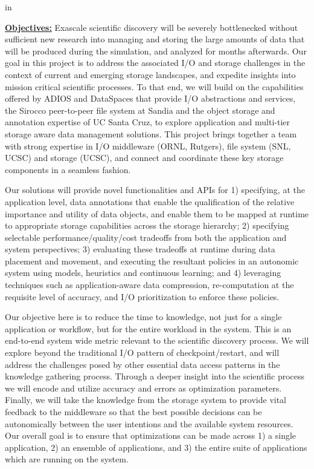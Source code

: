 \documentclass[11pt,letterpaper]{article}
\begin{document}
\setlength{\parindent}{0.5cm}

 in


\underline{\textbf{Objectives:}} Exascale scientific discovery will be
severely bottlenecked without sufficient new research into managing and
storing the large amounts of data that will be produced during the
simulation, and analyzed for months afterwards.  Our goal in this project is
to address the associated I/O and storage challenges in the context of
current and emerging storage landscapes, and expedite insights into mission
critical scientific processes. To that end, we will build on the
capabilities offered by ADIOS and DataSpaces that provide I/O abstractions
and services, the Sirocco peer-to-peer file system at
Sandia and the object storage and annotation expertise of UC Santa Cruz, to
explore application and multi-tier storage aware data management
solutions.    This project
brings together a  team with strong expertise in I/O middleware (ORNL,
Rutgers), file system (SNL, UCSC) and storage (UCSC), and connect and
coordinate these key storage components in a seamless fashion.

Our solutions will provide novel functionalities and APIs for
\setlength{\parindent}{0cm}
1) specifying, at the application level, data annotations that enable the
qualification of the relative importance and utility of data objects, and
enable them to be mapped at runtime to appropriate storage capabilities
across the storage hierarchy;
%
2) specifying selectable performance/quality/cost tradeoffs from both the
application and system perspectives;
%
3) evaluating these tradeoffs at runtime during data placement and movement,
and executing the resultant policies in an autonomic system using models,
heuristics and continuous learning; and
%
4) leveraging techniques such as application-aware data compression, re-computation at the
requisite level of accuracy, and I/O prioritization to enforce these
policies.
  
  \setlength{\parindent}{0.5cm}
  Our objective here is to reduce the time to knowledge, not just for a single
application or workflow, but for the entire workload in the system. This is
an end-to-end system wide metric relevant to the scientific discovery
process. We will explore beyond the traditional I/O pattern of
checkpoint/restart, and will address the challenges posed by other essential
data access patterns in the knowledge gathering process.  Through a deeper
insight into the scientific process we will encode and utilize accuracy and
errors as optimization parameters.  
Finally, we will take the knowledge from the storage system to provide vital feedback to the middleware 
so that the best possible decisions can be autonomically  between the user intentions and
the available system resources. Our overall goal is to ensure that optimizations can be made across
1) a single application, 2) an ensemble of applications, and 3) the entire suite of applications which are running on the system.
\end{document}
